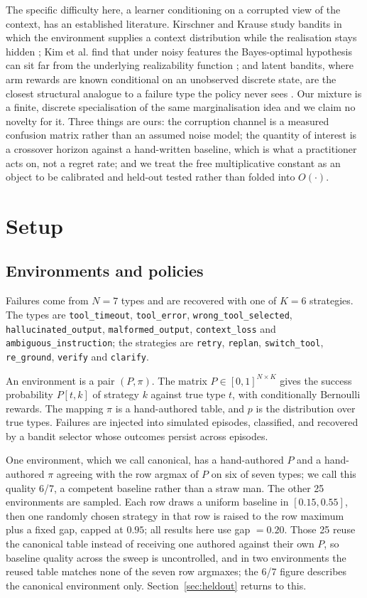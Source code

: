 \documentclass[conference]{IEEEtran}
\begin{document}
The specific difficulty here, a learner conditioning on a corrupted view of the
context, has an established literature. Kirschner and Krause study bandits in
which the environment supplies a context distribution while the realisation
stays hidden \cite{kirschner}; Kim et al. find that under noisy features the
Bayes-optimal hypothesis can sit far from the underlying realizability function
\cite{kim}; and latent bandits, where arm rewards are known conditional on an
unobserved discrete state, are the closest structural analogue to a failure
type the policy never sees \cite{maillard,hong}. Our mixture is a finite,
discrete specialisation of the same marginalisation idea and we claim no
novelty for it. Three things are ours: the corruption channel is a measured
confusion matrix rather than an assumed noise model; the quantity of interest
is a crossover horizon against a hand-written baseline, which is what a
practitioner acts on, not a regret rate; and we treat the free multiplicative
constant as an object to be calibrated and held-out tested rather than folded
into $O(\cdot)$.

\section{Setup}

\subsection{Environments and policies}

Failures come from $N = 7$ types and are recovered with one of $K = 6$
strategies. The types are \texttt{tool\_timeout}, \texttt{tool\_error},
\texttt{wrong\_tool\_selected}, \texttt{hallucinated\_output},
\texttt{malformed\_output}, \texttt{context\_loss} and
\texttt{ambiguous\_instruction}; the strategies are \texttt{retry},
\texttt{replan}, \texttt{switch\_tool}, \texttt{re\_ground}, \texttt{verify}
and \texttt{clarify}.

An environment is a pair $(P, \pi)$. The matrix $P \in [0,1]^{N \times K}$
gives the success probability $P[t,k]$ of strategy $k$ against true type $t$,
with conditionally Bernoulli rewards. The mapping $\pi$ is a hand-authored
table, and $p$ is the distribution over true types. Failures are injected into
simulated episodes, classified, and recovered by a bandit selector whose
outcomes persist across episodes.

One environment, which we call canonical, has a hand-authored $P$ and a
hand-authored $\pi$ agreeing with the row argmax of $P$ on six of seven types;
we call this quality 6/7, a competent baseline rather than a straw man. The
other 25 environments are sampled. Each row draws a uniform baseline in
$[0.15, 0.55]$, then one randomly chosen strategy in that row is raised to the
row maximum plus a fixed gap, capped at $0.95$; all results here use
gap $= 0.20$. Those 25 reuse the canonical table instead of receiving one
authored against their own $P$, so baseline quality across the sweep is
uncontrolled, and in two environments the reused table matches none of the
seven row argmaxes; the 6/7 figure describes the canonical environment only.
Section~\ref{sec:heldout} returns to this.
\end{document}
